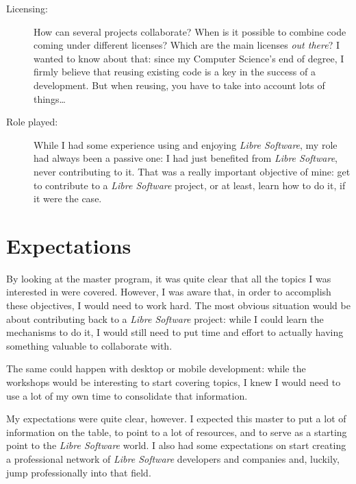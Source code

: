 \begin{description}
\item[Licensing:] How can several projects collaborate? When is it possible to
combine code coming under different licenses? Which are the main licenses {\it out there}?
I wanted to know about that: since my Computer Science's end of degree, I firmly
believe that reusing existing code is a key in the success of a development. But when
reusing, you have to take into account lots of things\dots

\item[Role played:] While I had some experience using and enjoying {\it Libre Software},
my role had always been a passive one: I had just benefited from {\it Libre Software},
never contributing to it. That was a really important objective of mine: get
to contribute to a {\it Libre Software} project, or at least, learn how to do it,
if it were the case.
\end{description}

\section{Expectations}

By looking at the master program, it was quite clear that all the topics I was interested
in were covered. However, I was aware that, in order to accomplish these objectives, I would 
need to work hard. The most obvious situation would be about contributing back to a
{\it Libre Software} project: while I could learn the mechanisms to do it, I would still
need to put time and effort to actually having something valuable to collaborate with.

The same could happen with desktop or mobile development: while the workshops would be interesting
to start covering topics, I knew I would need to use a lot of my own time to consolidate
that information.

My expectations were quite clear, however. I expected this master to put a lot of information
on the table, to point to a lot of resources, and to serve as a starting point to the {\it
Libre Software} world. I also had some expectations on start creating a professional network
of {\it Libre Software} developers and companies and, luckily, jump professionally into that
field. 
